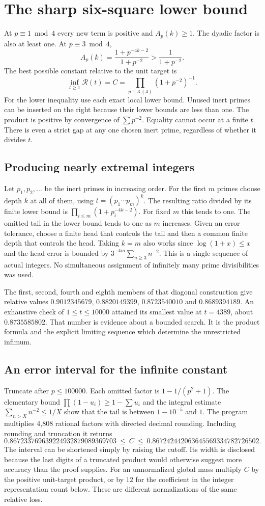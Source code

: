 \documentclass[12pt,letterpaper]{article}
\begin{document}
\section{The sharp six-square lower bound}
At $p\equiv1\bmod4$ every new term is positive and $A_p(k)\ge1$. The dyadic factor is also at least one. At $p\equiv3\bmod4$,
\[
 A_p(k)=\frac{1+p^{-4k-2}}{1+p^{-2}}>\frac1{1+p^{-2}}.
\]
The best possible constant relative to the unit target is
\[
 \boxed{\displaystyle \inf_{t\ge1}\mathcal R(t)
       = C=\prod_{p\equiv3\ (4)}(1+p^{-2})^{-1}.}
\]
For the lower inequality use each exact local lower bound. Unused inert primes can be inserted on the right because their lower bounds are less than one. The product is positive by convergence of $\sum p^{-2}$. Equality cannot occur at a finite $t$. There is even a strict gap at any one chosen inert prime, regardless of whether it divides $t$.
\subsection{Producing nearly extremal integers}
Let $p_1,p_2,\ldots$ be the inert primes in increasing order. For the first $m$ primes choose depth $k$ at all of them, using $t=(p_1\cdots p_m)^k$. The resulting ratio divided by its finite lower bound is $\prod_{i\le m}(1+p_i^{-4k-2})$. For fixed $m$ this tends to one. The omitted tail in the lower bound tends to one as $m$ increases. Given an error tolerance, choose a finite head that controls the tail and then a common finite depth that controls the head. Taking $k=m$ also works since $\log(1+x)\le x$ and the head error is bounded by $3^{-4m}\sum_{n\ge3}n^{-2}$. This is a single sequence of actual integers. No simultaneous assignment of infinitely many prime divisibilities was used.
\par
The first, second, fourth and eighth members of that diagonal construction give relative values $0.9012345679$, $0.8820149399$, $0.8723540010$ and $0.8689394189$. An exhaustive check of $1\le t\le10000$ attained its smallest value at $t=4389$, about $0.8735585802$. That number is evidence about a bounded search. It is the product formula and the explicit limiting sequence which determine the unrestricted infimum.
\subsection{An error interval for the infinite constant}
Truncate after $p\le 100000$. Each omitted factor is $1-1/(p^2+1)$. The elementary bound $\prod(1-u_i)\ge1-\sum u_i$ and the integral estimate $\sum_{n>X}n^{-2}\le1/X$ show that the tail is between $1-10^{-5}$ and $1$. The program multiplies 4,808 rational factors with directed decimal rounding. Including rounding and truncation it returns
\[
 0.867233769639224932879089369703
 \ \le\ C\ \le\
 0.867242442063645569334782726502 .
\]
The interval can be shortened simply by raising the cutoff. Its width is disclosed because the last digits of a truncated product would otherwise suggest more accuracy than the proof supplies. For an unnormalized global mass multiply $C$ by the positive unit-target product, or by $12$ for the coefficient in the integer representation count below. These are different normalizations of the same relative loss.
\end{document}
